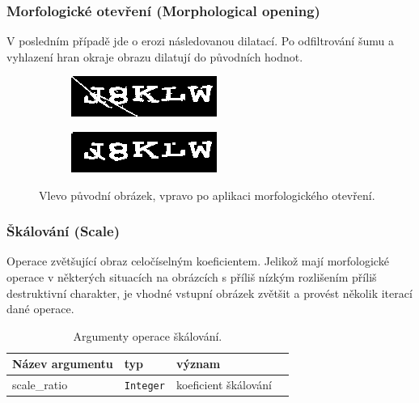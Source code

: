 \documentclass[
  field=ainfp,
  master=true,
  biblatex,
  sourcecodes=false,
  theorems=false,
  glossaries,
  index
]{kidiplom}
\begin{document}
\subsubsection*{Morfologické otevření (Morphological opening)}
V posledním případě jde o erozi následovanou dilatací. Po odfiltrování šumu a vyhlazení hran okraje obrazu dilatují do původních hodnot.
\begin{figure}[H]
\centering
\begin{subfigure}{.5\textwidth}
  \centering
  \includegraphics[width=.8\linewidth]{images/opening_original.png}
\end{subfigure}%
\begin{subfigure}{.5\textwidth}
  \centering
  \includegraphics[width=.8\linewidth]{images/opening_result.png}
\end{subfigure}
\caption{Vlevo původní obrázek, vpravo po aplikaci morfologického otevření.}
\label{fig:inverse_example}
\end{figure}

\subsubsection*{Škálování (Scale)}
Operace zvětšující obraz celočíselným koeficientem. Jelikož mají morfologické operace v některých situacích na obrázcích s příliš nízkým rozlišením příliš destruktivní charakter, je vhodné vstupní obrázek zvětšit a provést několik iterací dané operace.

\begin{table}[H]
\centering
\begin{tabular}{|l|l|l|l|}
\hline
\textbf{Název argumentu} & \textbf{typ} & \textbf{význam}
\\ \hline
scale\_ratio & \texttt{Integer} & koeficient škálování
\\ \hline
\end{tabular}
\caption{Argumenty operace škálování.}
\end{table}
\end{document}
